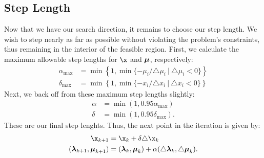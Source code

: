  %

\subsection*{Step Length}

Now that we have our search direction, it remains to choose our step length.
We wish to step nearly as far as possible without violating the problem's constraints, thus remaining in the interior of the feasible region.
First, we calculate the maximum allowable step lengths for $\x$ and $\boldsymbol{\mu}$, respectively:
\begin{align*}
\alpha_{\max} &= \min\left\{1, \min\{-\mu_i/\triangle \mu_i\ |\ \triangle \mu_i < 0 \}\right\}\\
\delta_{\max} &= \min\left\{1, \min\{-x_i/\triangle x_i\ |\ \triangle x_i < 0 \}\right\}
\end{align*}
Next, we back off from these maximum step lengths slightly:
\begin{align*}
\alpha &= \min(1, 0.95\alpha_{\max})\\
\delta &= \min(1, 0.95\delta_{\max}).
\end{align*}
These are our final step lenghts.
Thus, the next point in the iteration is given by:
\begin{align*}
\x_{k+1} &= \x_k + \delta \triangle \x_k\\
(\Lamb_{k+1}, \Mu_{k+1}) &= (\Lamb_k, \Mu_k) + \alpha(\triangle \Lamb_k, \triangle \Mu_k).
\end{align*}

